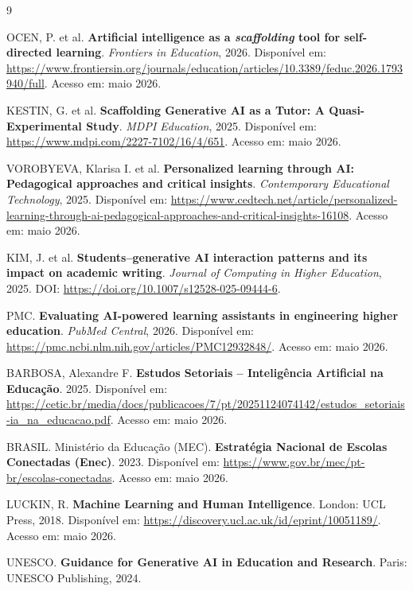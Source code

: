 \documentclass[10pt, a4paper, twocolumn]{article}
\begin{document}
\begin{thebibliography}{9}
\small

OCEN, P. et al.
\textbf{Artificial intelligence as a \textit{scaffolding} tool for self-directed learning}.
\textit{Frontiers in Education}, 2026.
Disponível em: \url{https://www.frontiersin.org/journals/education/articles/10.3389/feduc.2026.1793940/full}.
Acesso em: maio 2026.

KESTIN, G. et al.
\textbf{Scaffolding Generative AI as a Tutor: A Quasi-Experimental Study}.
\textit{MDPI Education}, 2025.
Disponível em: \url{https://www.mdpi.com/2227-7102/16/4/651}.
Acesso em: maio 2026.

VOROBYEVA, Klarisa I. et al.
\textbf{Personalized learning through AI: Pedagogical approaches and critical insights}.
\textit{Contemporary Educational Technology}, 2025.
Disponível em: \url{https://www.cedtech.net/article/personalized-learning-through-ai-pedagogical-approaches-and-critical-insights-16108}.
Acesso em: maio 2026.

KIM, J. et al.
\textbf{Students--generative AI interaction patterns and its impact on academic writing}.
\textit{Journal of Computing in Higher Education}, 2025.
DOI: \url{https://doi.org/10.1007/s12528-025-09444-6}.

PMC.
\textbf{Evaluating AI-powered learning assistants in engineering higher education}.
\textit{PubMed Central}, 2026.
Disponível em: \url{https://pmc.ncbi.nlm.nih.gov/articles/PMC12932848/}.
Acesso em: maio 2026.

BARBOSA, Alexandre F.
\textbf{Estudos Setoriais -- Inteligência Artificial na Educação}. 2025.
Disponível em: \url{https://cetic.br/media/docs/publicacoes/7/pt/20251124074142/estudos_setoriais-ia_na_educacao.pdf}.
Acesso em: maio 2026.

BRASIL. Ministério da Educação (MEC).
\textbf{Estratégia Nacional de Escolas Conectadas (Enec)}. 2023.
Disponível em: \url{https://www.gov.br/mec/pt-br/escolas-conectadas}.
Acesso em: maio 2026.

LUCKIN, R.
\textbf{Machine Learning and Human Intelligence}.
London: UCL Press, 2018.
Disponível em: \url{https://discovery.ucl.ac.uk/id/eprint/10051189/}.
Acesso em: maio 2026.

UNESCO.
\textbf{Guidance for Generative AI in Education and Research}.
Paris: UNESCO Publishing, 2024.

\end{thebibliography}
\end{document}
